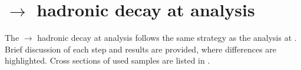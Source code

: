 \begin{table}[!tbp]
\caption[Selection efficiency and number of events for signal and background  at  .]%
{List of signal and background samples with selection efficiency and number of events at  , assuming a luminosity of 1500$fb^{-1}$. The number of events, selection efficiency of pre-selection, selection efficiency of MVA after pre-selection, number of events after MVA are shown. - represents a number less than  0.01.}
\label{tab:doubleHiggs1.4TeVMVA}
\end{table}



\section{\eeToHH $\to$ \HepProcess{ \Pbottom \APbottom \PWplus \PWminus \Pnu \APnu} hadronic decay at  analysis}

The \eeToHH $\to$ \HepProcess{ \Pbottom \APbottom \PWplus \PWminus \Pnu \APnu} hadronic decay at  analysis follows the same strategy as the analysis at . Brief discussion of each step and results are provided, where differences are highlighted. Cross sections of used samples  are listed in .

